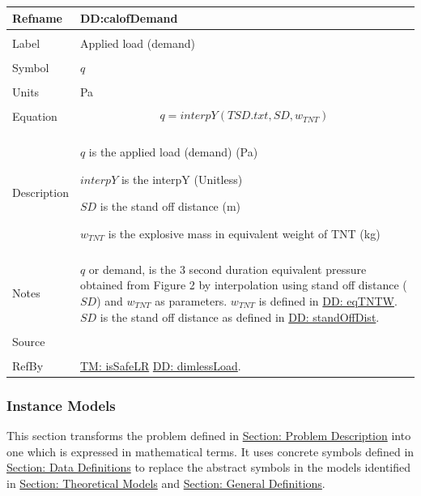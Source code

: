 \documentclass[12pt]{article}
\begin{document}
\noindent \begin{minipage}{\textwidth}
\begin{tabular}{p{} p{}}
\toprule \textbf{Refname} & \textbf{DD:calofDemand}
\label{DD:calofDemand}
\\ \midrule \\
Label & Applied load (demand)
\\ \midrule \\
Symbol & $q$
\\ \midrule \\
Units & Pa
\\ \midrule \\
Equation & \begin{displaymath}
           q=interpY\left(TSD.txt,SD,{w_{TNT}}\right)
           \end{displaymath}
\\ \midrule \\
Description & \begin{symbDescription}
              \item{$q$ is the applied load (demand) (Pa)}
              \item{$interpY$ is the interpY (Unitless)}
              \item{$SD$ is the stand off distance (m)}
              \item{${w_{TNT}}$ is the explosive mass in equivalent weight of TNT (kg)}
              \end{symbDescription}
\\ \midrule \\
Notes & $q$ or demand, is the 3 second duration equivalent pressure obtained from Figure 2 by interpolation using stand off distance ($SD$) and ${w_{TNT}}$ as parameters. ${w_{TNT}}$ is defined in \hyperref[DD:eqTNTW]{DD: eqTNTW}. $SD$ is the stand off distance as defined in \hyperref[DD:standOffDist]{DD: standOffDist}.
\\ \midrule \\
Source & \cite{astm2009}
\\ \midrule \\
RefBy & \hyperref[TM:isSafeLR]{TM: isSafeLR} \hyperref[DD:dimlessLoad]{DD: dimlessLoad}.
\\ \bottomrule \end{tabular}
\end{minipage}
\subsubsection{Instance Models}
\label{Sec:IMs}
This section transforms the problem defined in \hyperref[Sec:ProbDesc]{Section: Problem Description} into one which is expressed in mathematical terms. It uses concrete symbols defined in \hyperref[Sec:DDs]{Section: Data Definitions} to replace the abstract symbols in the models identified in \hyperref[Sec:TMs]{Section: Theoretical Models} and \hyperref[Sec:GDs]{Section: General Definitions}.
\par~
\end{document}
